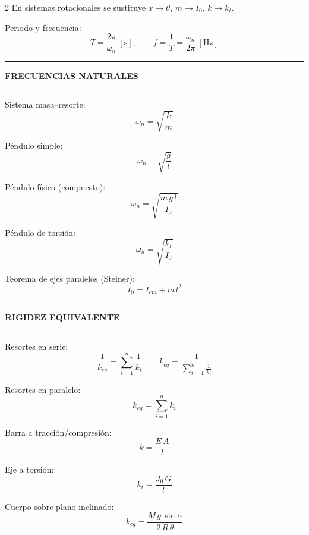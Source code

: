 \documentclass[10pt,a4paper]{article}
\newcommand{\seccion}[1]{%
  \vspace{2mm}\hrule\vspace{1mm}%
  \textbf{\footnotesize\MakeUppercase{#1}}\vspace{1mm}\hrule\vspace{2mm}}
\begin{document}
\begin{multicols}{2}
En sistemas rotacionales se sustituye $x \rightarrow \theta$,
$m \rightarrow I_0$, $k \rightarrow k_t$.

Periodo y frecuencia:
\begin{equation*}
  T = \frac{2\pi}{\omega_n}\ [\mathrm{s}],
  \qquad
  f = \frac{1}{T} = \frac{\omega_n}{2\pi}\ [\mathrm{Hz}]
\end{equation*}

\seccion{Frecuencias naturales}

Sistema masa--resorte:
\begin{equation*}
  \omega_n = \sqrt{\frac{k}{m}}
\end{equation*}

Péndulo simple:
\begin{equation*}
  \omega_n = \sqrt{\frac{g}{l}}
\end{equation*}

Péndulo físico (compuesto):
\begin{equation*}
  \omega_n = \sqrt{\frac{m\,g\,l}{I_0}}
\end{equation*}

Péndulo de torsión:
\begin{equation*}
  \omega_n = \sqrt{\frac{k_t}{I_0}}
\end{equation*}

Teorema de ejes paralelos (Steiner):
\begin{equation*}
  I_0 = I_{cm} + m\,l^{2}
\end{equation*}

\seccion{Rigidez equivalente}

Resortes en serie:
\begin{equation*}
  \frac{1}{k_{eq}} = \sum_{i=1}^{n}\frac{1}{k_i}
  \qquad
  k_{eq} = \frac{1}{\displaystyle\sum_{i=1}^{n}\frac{1}{k_i}}
\end{equation*}

Resortes en paralelo:
\begin{equation*}
  k_{eq} = \sum_{i=1}^{n} k_i
\end{equation*}

Barra a tracción/compresión:
\begin{equation*}
  k = \frac{E\,A}{l}
\end{equation*}

Eje a torsión:
\begin{equation*}
  k_t = \frac{J_0\,G}{l}
\end{equation*}

Cuerpo sobre plano inclinado:
\begin{equation*}
  k_{eq} = \frac{M\,g\,\sin\alpha}{2\,R\,\theta}
\end{equation*}


\end{multicols}
\end{document}
